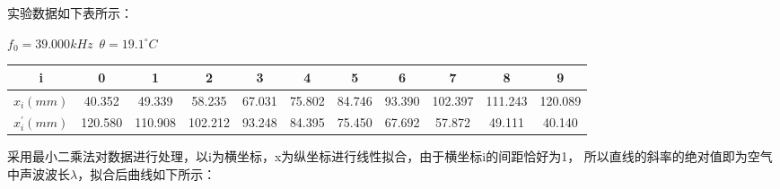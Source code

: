 \documentclass{article}
\newcommand{\degreesCelsius}{^\circ C}
\begin{document}
    实验数据如下表所示：
    
    $f_0=39.000kHz$\ $\theta=19.1\degreesCelsius$
    \begin{center}
        \begin{tabular}{|c|c|c|c|c|c|c|c|c|c|c|}
            \hline
            i & 0     & 1     & 2     & 3     & 4     & 5     & 6     & 7     & 8     & 9 \\
            \hline
            $x_i(mm) $ & 40.352  & 49.339  & 58.235  & 67.031  & 75.802  & 84.746  & 93.390  & 102.397  & 111.243  & 120.089  \\
            \hline
            $x_i^{'}(mm)$ & 120.580  & 110.908  & 102.212  & 93.248  & 84.395  & 75.450  & 67.692  & 57.872  & 49.111  & 40.140  \\
            \hline
        \end{tabular}
    \end{center}

    采用最小二乘法对数据进行处理，以i为横坐标，x为纵坐标进行线性拟合，由于横坐标i的间距恰好为1，
    所以直线的斜率的绝对值即为空气中声波波长$\lambda$，拟合后曲线如下所示：
\end{document}
